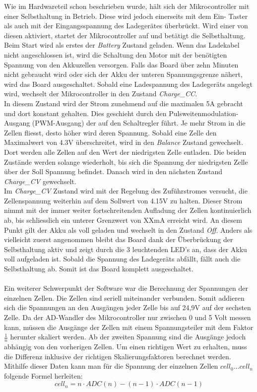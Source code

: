 Wie im Hardwareteil schon beschrieben wurde, hält sich der Mikrocontroller mit einer Selbsthaltung in Betrieb. Diese wird jedoch einerseits mit dem Ein- Taster als auch mit der Eingangsspannung des Ladegerätes überbrückt. Wird einer von diesen aktiviert, startet der Mikrocontroller auf und betätigt die Selbsthaltung. \\
Beim Start wird als erstes der \textit{Battery} Zustand geladen. Wenn das Ladekabel nicht angeschlossen ist, wird die Schaltung den Motor mit der benötigten Spannung von den Akkuzellen versorgen. Falls das Board über zehn Minuten nicht gebraucht wird oder sich der Akku der unteren Spannungsgrenze nähert, wird das Board ausgeschaltet. Sobald eine Ladespannung des Ladegeräts angelegt wird, wechselt der Mikrocontroller in den Zustand \textit{Charge\_CC}.\\
In diesem Zustand wird der Strom zunehmend auf die maximalen 5A gebracht und dort konstant gehalten. Dies geschieht durch den Pulsweitenmodulation-Ausgang (PWM-Ausgang) der auf den Schaltregler führt. Je mehr Strom in die Zellen fliesst, desto höher wird deren Spannung. Sobald eine Zelle den Maximalwert von 4.3V überschreitet, wird in den \textit{Balance} Zustand gewechselt. Dort werden alle Zellen auf den Wert der niedrigsten Zelle entladen. Die beiden Zustände werden solange wiederholt, bis sich die  Spannung der niedrigsten Zelle über der Soll Spannung befindet.  Danach wird in den nächsten Zustand \textit{Charge\_CV} gewechselt. \\
Im \textit{Charge\_CV} Zustand wird mit der Regelung des Zuführstromes versucht, die Zellenspannung weiterhin auf dem Sollwert von 4.15V zu halten. Dieser Strom nimmt mit der immer weiter fortschreitenden Aufladung der Zellen kontinuierlich ab, bis schliesslich ein unterer Grenzwert von XXmA  erreicht wird. An diesem Punkt gilt der Akku als voll geladen und wechselt in den Zustand \textit{Off}.
Anders als vielleicht zuerst angenommen bleibt das Board dank der Überbrückung der Selbsthaltung aktiv und zeigt durch die 3 leuchtenden LED’s an, dass der Akku voll aufgeladen ist. Sobald  die Spannung des Ladegeräts abfällt, fällt auch die Selbsthaltung ab. Somit ist das Board komplett ausgeschaltet.
\\\\
Ein weiterer Schwerpunkt der Software war die Berechnung der Spannungen der einzelnen Zellen. Die Zellen sind seriell miteinander verbunden. Somit addieren sich die Spannungen an den Ausgängen jeder Zelle bis auf 24,9V auf der sechsten Zelle. Da der AD-Wandler des Mikrocontroller nur zwischen 0 und 5 Volt messen kann, müssen die Ausgänge der Zellen mit einem Spannungsteiler mit dem Faktor \(\frac 1n\) herunter skaliert werden. Ab der zweiten Spannung sind die Ausgänge jedoch abhängig von den vorherigen Zellen. Um einen richtigen Wert zu erhalten, muss die Differenz inklusive der richtigen Skalierungsfaktoren berechnet werden. Mithilfe dieser Daten kann man für die Spannung der einzelnen Zellen \(cell_0 \dots cell_n\) folgende Formel herleiten:
\begin{equation}
	cell_n = n \cdot ADC(n) - (n-1)\cdot ADC(n-1)
	\label{eq:CellNSpannung}
\end{equation}

